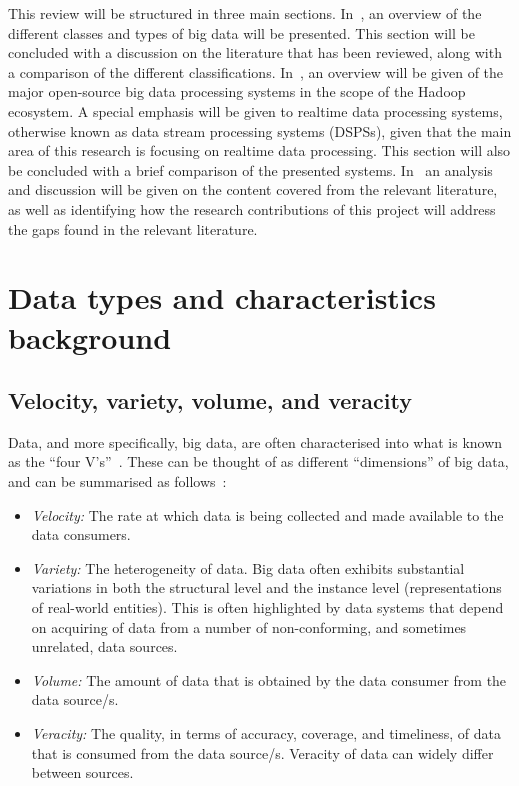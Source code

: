 \documentclass[a4paper,11pt]{article}
\begin{document}
This review will be structured in three main sections. In~, an overview of the
different classes and types of big data will be presented. This section will be concluded with a discussion on the
literature that has been reviewed, along with a comparison of the different classifications.
In~, an overview will be given of the major open-source big data processing
systems in the scope of the Hadoop ecosystem. A special emphasis will be given to realtime data processing systems,
otherwise known as data stream processing systems (DSPSs), given that the main area of this research is focusing on
realtime data processing. This section will also be concluded with a brief comparison of the presented systems.
In~ an analysis and discussion will be given on the content covered from the relevant
literature, as well as identifying how the research contributions of this project will address the gaps found in the
relevant literature.


\newpage


\section{Data types and characteristics background} %
\label{sec:big_data_types_background}

\subsection{Velocity, variety, volume, and veracity} %
\label{sub:four_v}

Data, and more specifically, big data, are often characterised into what is known as the ``four
V's''~\cite{wang2014bigdatabench}. These can be thought of as different ``dimensions'' of big data, and can be
summarised as follows~\cite{dong2013big}:

\begin{itemize}
  \item \emph{Velocity:} The rate at which data is being collected and made available to the data consumers.
  \item \emph{Variety:} The heterogeneity of data. Big data often exhibits substantial variations in both the structural
  level and the instance level (representations of real-world entities). This is often highlighted by data systems that
  depend on acquiring of data from a number of non-conforming, and sometimes unrelated, data sources.
  \item \emph{Volume:} The amount of data that is obtained by the data consumer from the data source/s.
  \item \emph{Veracity:} The quality, in terms of accuracy, coverage, and timeliness, of data that is consumed from
  the data source/s. Veracity of data can widely differ between sources.
\end{itemize}
\end{document}
